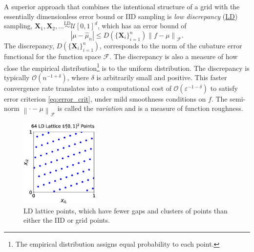 \documentclass[11pt]{NSFamsart}
\newcommand{\LD}{\hyperlink{LDlink}{LD}\xspace}
\newcommand{\bX}{{\boldsymbol{X}}}
\newcommand{\calf}{{\mathcal{F}}}
\newcommand{\calu}{{\mathcal{U}}}
\def\abs#1{\ensuremath{\left \lvert #1 \right \rvert}}
\newcommand{\norm}[2][{}]{\ensuremath{\left \lVert #2 \right \rVert}_{#1}}
\newcommand{\Order}{\mathcal{O}}
\newcommand{\hmu}{\hat{\mu}}
\newcommand{\LDSim}{\overset{\text{LD}}{\sim}}
\begin{document}
A superior approach that combines the intentional structure of a grid with the essentially dimensionless error bound or IID sampling is \hypertarget{LDlink}{\emph{low discrepancy}} (\LD)  sampling, $\bX_1, \bX_2,  \ldots \LDSim \calu[0,1]^d$, which has an error bound of \cite{Nie92,Hic99a}
\begin{equation} \label{eq:KH}
 \abs{\mu - \hmu_n} \le D(\{\bX_i\}_{i=1}^n) \norm[\calf]{f - \mu}.
\end{equation}
The discrepancy,  $D(\{\bX_i\}_{i=1}^n)$, corresponds to the norm of the cubature error functional \cite{Hic97a} for the function space $\calf$.  The discrepancy is also a measure of how close the empirical distribution\footnote{The empirical distribution assigns equal probability to each point.} is to the uniform distribution. 
The discrepancy is typically $\Order(n^{-1 + \delta})$, where $\delta$ is arbitrarily small and positive. This faster convergence rate translates into a computational cost of $\Order(\varepsilon^{-1-\delta})$ to satisfy error criterion \eqref{eq:error_crit}, under mild smoothness conditions on $f$.  The semi-norm $\norm[\calf]{\cdot - \mu}$ is called the \emph{variation} and is a measure of function roughness. 

\begin{figure}
	\centering
	\includegraphics[width = 0.35\textwidth]{ProgramsImages/lattice_scatter.eps}
	\caption{LD lattice points, which have fewer gaps and clusters of points than either the IID or grid points. \label{fig:iid_vs_ld}}
\end{figure}
\end{document}
